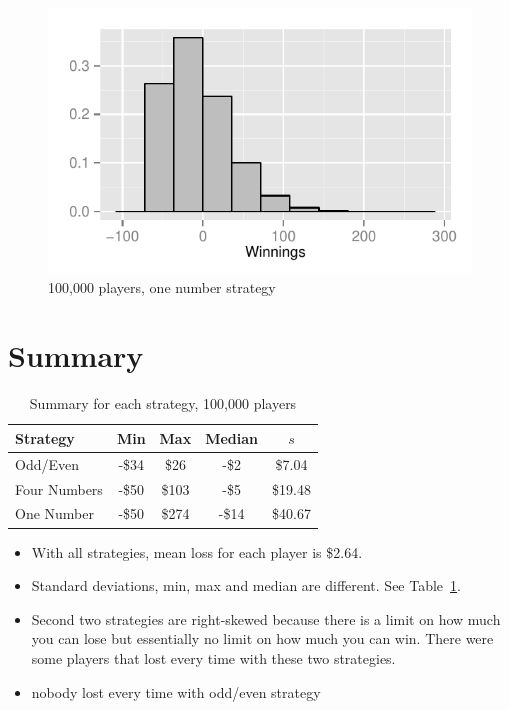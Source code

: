 \documentclass[landscape]{exam}
\begin{document}
  \begin{figure}[H]
    \centering
    \includegraphics[scale = 0.9]{figures/roulette/1_100000_50_fraction.pdf}
    \caption{100,000 players, one number strategy}
  \end{figure}

  \section{Summary} %
  \begin{table}[H]
    \centering
    \begin{tabular}{lcccc}
      \toprule
      Strategy     & Min   & Max   & Median & $s$ \\
      \midrule
      Odd/Even     & -\$34 & \$26  & -\$2   & \$7.04 \\
      Four Numbers & -\$50 & \$103 & -\$5   & \$19.48 \\
      One Number   & -\$50 & \$274 & -\$14  & \$40.67 \\
      \bottomrule
    \end{tabular}
    \caption{Summary for each strategy, 100,000 players}\label{tab:roulette}
  \end{table}

  \begin{itemize}
    \item With all strategies, mean loss for each player is \$2.64.

    \item Standard deviations, min, max and median are different. 
      See Table~\ref{tab:roulette}.

    \item Second two strategies are right-skewed because there is a limit on how
      much you can lose but essentially no limit on how much you can win. There
      were some players that lost every time with these two strategies.

    \item nobody lost every time with odd/even strategy
  \end{itemize}
\end{document}
